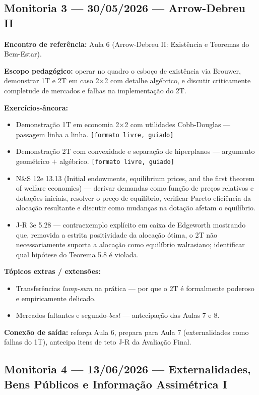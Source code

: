 \documentclass[11pt,a4paper]{article}
\newcommand{\ns}{N\&S 12e}
\newcommand{\jr}{J-R 3e}
\begin{document}
\subsection{Monitoria 3 --- 30/05/2026 --- Arrow-Debreu II}

\textbf{Encontro de referência:} Aula 6 (Arrow-Debreu II: Existência e Teoremas do Bem-Estar).

\textbf{Escopo pedagógico:} operar no quadro o esboço de existência via Brouwer, demonstrar 1T e 2T em caso 2$\times$2 com detalhe algébrico, e discutir criticamente completude de mercados e falhas na implementação do 2T.

\textbf{Exercícios-âncora:}
\begin{itemize}
  \item Demonstração 1T em economia 2$\times$2 com utilidades Cobb-Douglas --- passagem linha a linha. \texttt{[formato livre, guiado]}
  \item Demonstração 2T com convexidade e separação de hiperplanos --- argumento geométrico $+$ algébrico. \texttt{[formato livre, guiado]}
  \item \ns{} 13.13 (Initial endowments, equilibrium prices, and the first theorem of welfare economics) --- derivar demandas como função de preços relativos e dotações iniciais, resolver o preço de equilíbrio, verificar Pareto-eficiência da alocação resultante e discutir como mudanças na dotação afetam o equilíbrio.
  \item \jr{} 5.28 --- contraexemplo explícito em caixa de Edgeworth mostrando que, removida a estrita positividade da alocação ótima, o 2T não necessariamente suporta a alocação como equilíbrio walrasiano; identificar qual hipótese do Teorema 5.8 é violada.
\end{itemize}

\textbf{Tópicos extras / extensões:}
\begin{itemize}
  \item Transferências \textit{lump-sum} na prática --- por que o 2T é formalmente poderoso e empiricamente delicado.
  \item Mercados faltantes e segundo-\textit{best} --- antecipação das Aulas 7 e 8.
\end{itemize}

\textbf{Conexão de saída:} reforça Aula 6, prepara para Aula 7 (externalidades como falhas do 1T), antecipa itens de teto J-R da Avaliação Final.

\subsection{Monitoria 4 --- 13/06/2026 --- Externalidades, Bens Públicos e Informação Assimétrica I}
\end{document}
